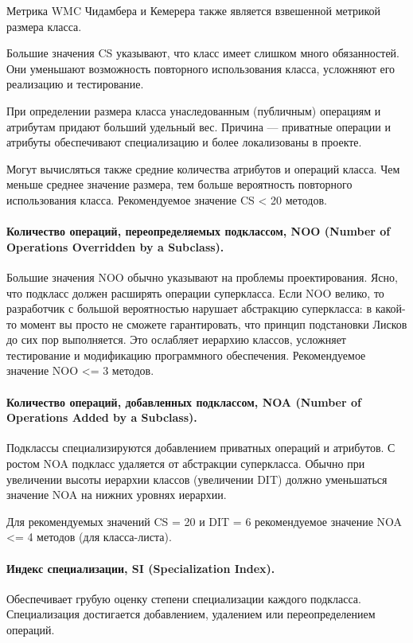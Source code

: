 \documentclass{../../text-style}
\begin{document}
Метрика WMC Чидамбера и Кемерера также является взвешенной метрикой размера класса.

Большие значения CS указывают, что класс имеет слишком много обязанностей. Они уменьшают возможность повторного использования класса, усложняют его реализацию и тестирование.

При определении размера класса унаследованным (публичным) операциям и атрибутам придают больший удельный вес. Причина --- приватные операции и атрибуты обеспечивают специализацию и более локализованы в проекте.

Могут вычисляться также средние количества атрибутов и операций класса. Чем меньше среднее значение размера, тем больше вероятность повторного использования класса. 
Рекомендуемое значение CS < 20 методов.

\paragraph{Количество операций, переопределяемых подклассом, NOO (Number of Operations Overridden by a Subclass).} Большие значения NOO обычно указывают на проблемы проектирования. Ясно, что подкласс должен расширять операции суперкласса. Если NOO велико, то разработчик с большой вероятностью нарушает абстракцию суперкласса: в какой-то момент вы просто не сможете гарантировать, что принцип подстановки Лисков до сих пор выполняется.  Это ослабляет иерархию классов, усложняет тестирование и модификацию программного обеспечения.
Рекомендуемое значение NOO <= 3 методов.

\paragraph{Количество операций, добавленных подклассом, NOA (Number of Operations Added by a Subclass).} Подклассы специализируются добавлением приватных операций и атрибутов. С ро­стом NOA подкласс удаляется от абстракции суперкласса. Обычно при увеличении высоты иерархии классов (увеличении DIT) должно уменьшаться значение NOA на нижних уровнях иерархии.

Для рекомендуемых значений CS = 20 и DIT = 6 рекомендуемое значение NOA <= 4 методов (для класса-листа).

\paragraph{Индекс специализации, SI (Specialization Index).} Обеспечивает грубую оценку степени специализации каждого подкласса. Специали­зация достигается добавлением, удалением или переопределением операций.
\end{document}

